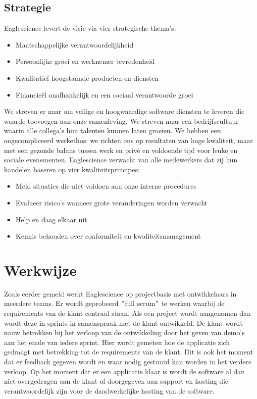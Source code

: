\subsection{Strategie}\label{subsec:strategie}
Eaglescience levert de visie via vier strategische thema's:
\begin{itemize}
    \item Maatschappelijke verantwoordelijkheid
    \item Persoonlijke groei en werknemer tevredenheid
    \item Kwalitatief hoogstaande producten en diensten
    \item Financieël onafhankelijk en een sociaal verantwoorde groei
\end{itemize}
We streven er naar om veilige en hoogwaardige software diensten te leveren die waarde toevoegen aan onze samenleving. We streven naar een bedrijfscultuur waarin alle collega's hun talenten kunnen laten groeien. We hebben een ongecompliceerd werkethos: we richten ons op resultaten van hoge kwaliteit, maar met een gezonde balans tussen werk en privé en voldoende tijd voor leuke en sociale evenementen.
\newpage
Eaglescience verwacht van alle medewerkers dat zij hun handelen baseren op vier kwaliteitsprincipes:
\begin{itemize}
    \item Meld situaties die niet voldoen aan onze interne procedures
    \item Evalueer risico's wanneer grote veranderingen worden verwacht
    \item Help en daag elkaar uit
    \item Kennis behouden over conformiteit en kwaliteitsmanagement
\end{itemize}

\section{Werkwijze}\label{sec:werkwijze}
Zoals eerder gemeld werkt Eaglescience op projectbasis met ontwikkelaars in meerdere teams. Er wordt geprobeerd $"$full scrum$"$ te werken waarbij de requirements van de klant centraal staan. Als een project wordt aangenomen dan wordt deze in sprints in samenspraak met de klant ontwikkeld. De klant wordt nauw betrokken bij het verloop van de ontwikkeling door het geven van demo's aan het einde van iedere sprint. Hier wordt gemeten hoe de applicatie zich gedraagt met betrekking tot de requirements van de klant. Dit is ook het moment dat er feedback gegeven wordt en waar nodig gestuurd kan worden in het verdere verloop. Op het moment dat er een applicatie klaar is wordt de software al dan niet overgedragen aan de klant of doorgegeven aan support en hosting die verantwoordelijk zijn voor de daadwerkelijke hosting van de software.

